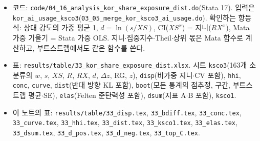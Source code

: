 \documentclass[11pt]{article}
\begin{document}
\begin{itemize}[leftmargin=*]
  \item 코드: \texttt{code/04\_16\_analysis\_kor\_share\_exposure\_dist.do}(Stata 17). 입력은 \texttt{kor\_ai\_usage\_ksco3}(\texttt{03\_05\_merge\_kor\_ksco3\_ai\_usage.do}). 확인하는 항등식: 상대 강도의 가중 평균 1, $d = \ln(s / XS)$, CI($XS^x$) = 지니($RX^x$), Mata 가중 기울기 = Stata 가중 OLS. 지니$\cdot$집중지수$\cdot$Theil$\cdot$상위 몫은 Mata 함수로 계산하고, 부트스트랩에서도 같은 함수를 쓴다.
  \item 표: \texttt{results/table/33\_kor\_share\_exposure\_dist.xlsx}. 시트 \texttt{ksco3}(163개 소분류의 $w$, $s$, $XS$, $R$, $RX$, $d$, $\Delta z$, RG, $z$), \texttt{disp}(비가중 지니$\cdot$CV 포함), \texttt{hhi}, \texttt{conc}, \texttt{curve}, \texttt{dist}(반대 방향 KL 포함), \texttt{boot}(모든 통계의 점추정, 구간, 부트스트랩 평균$\cdot$SE), \texttt{elas}(Felten 준탄력성 포함), \texttt{dsum}(지표 A$\cdot$B 포함), \texttt{ksco1}.
  \item 이 노트의 표: \texttt{results/table/33\_disp.tex}, \texttt{33\_bdiff.tex}, \texttt{33\_conc.tex}, \texttt{33\_curve.tex}, \texttt{33\_hhi.tex}, \texttt{33\_dist.tex}, \texttt{33\_ksco1.tex}, \texttt{33\_elas.tex}, \texttt{33\_dsum.tex}, \texttt{33\_d\_pos.tex}, \texttt{33\_d\_neg.tex}, \texttt{33\_top\_C.tex}.
\end{itemize}

\printbibliography[title={참고문헌}]
\end{document}
